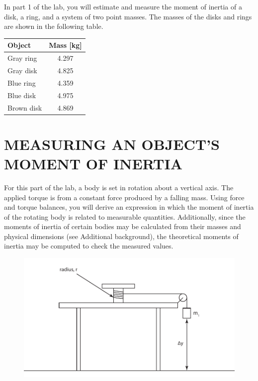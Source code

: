 \documentclass[11pt,letterpaper]{article}
\begin{document}
In part 1 of the lab, you will estimate and measure the moment of inertia of a disk, a ring, and a system of two point masses. The masses of the disks and rings are shown in the following table.
\begin{table}[h]
\begin{tabular}{|l|c|}
\hline
Object & Mass [kg]\\
\hline
Gray ring & 4.297\\
Gray disk & 4.825\\
Blue ring & 4.359\\
Blue disk & 4.975\\
Brown disk & 4.869\\
\hline
\end{tabular}
\end{table}


\section{MEASURING AN OBJECT'S MOMENT OF INERTIA}
For this part of the lab, a body is set in rotation about a vertical axis.  The applied
torque is from a constant force produced by a falling mass. Using force and torque balances, you will derive an expression in which the moment of inertia of the rotating body is related to measurable quantities. Additionally, since the moments of inertia of certain bodies may be calculated from their masses and physical dimensions (see Additional background), the theoretical moments of inertia may be computed to check the measured values.

\begin{figure}[h]
\begin{center}
\includegraphics{./rotating_drum}
\end{center}
\label{fig:schematic}
\end{figure}
\end{document}
